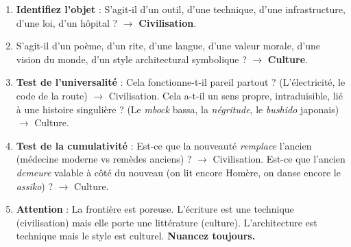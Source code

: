 \documentclass[11pt]{article}
\begin{document}
\begin{methode}
\begin{enumerate}
    \item \textbf{Identifiez l'objet} : S'agit-il d'un outil, d'une technique, d'une infrastructure, d'une loi, d'un hôpital ? $\rightarrow$ \textbf{Civilisation}.
    \item S'agit-il d'un poème, d'un rite, d'une langue, d'une valeur morale, d'une vision du monde, d'un style architectural symbolique ? $\rightarrow$ \textbf{Culture}.
    \item \textbf{Test de l'universalité} : Cela fonctionne-t-il pareil partout ? (L'électricité, le code de la route) $\rightarrow$ Civilisation. Cela a-t-il un sens propre, intraduisible, lié à une histoire singulière ? (Le \emph{mbock} bassa, la \emph{négritude}, le \emph{bushido} japonais) $\rightarrow$ Culture.
    \item \textbf{Test de la cumulativité} : Est-ce que la nouveauté \emph{remplace} l'ancien (médecine moderne vs remèdes anciens) ? $\rightarrow$ Civilisation. Est-ce que l'ancien \emph{demeure} valable à côté du nouveau (on lit encore Homère, on danse encore le \emph{assiko}) ? $\rightarrow$ Culture.
    \item \textbf{Attention} : La frontière est poreuse. L'écriture est une technique (civilisation) mais elle porte une littérature (culture). L'architecture est technique mais le style est culturel. \textbf{Nuancez toujours.}
\end{enumerate}
\end{methode}
\end{document}
